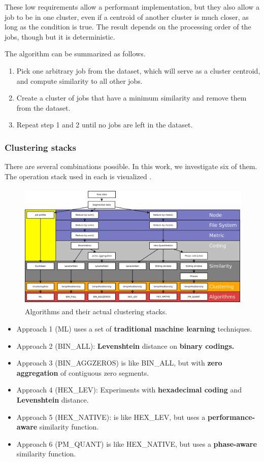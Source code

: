 \documentclass[]{llncs}
\begin{document}
These low requirements allow a performant implementation, but they also allow a job to be in one cluster, even if a centroid of another cluster is much closer, as long as the condition is true.
The result depends on the processing order of the jobs, though but it is deterministic.

The algorithm can be summarized as follows.

\begin{enumerate}
 \item Pick one arbitrary job from the dataset, which will serve as a cluster centroid, and compute similarity to all other jobs.
 \item Create a cluster of jobs that have a minimum similarity and remove them from the dataset.
 \item Repeat step 1 and 2 until no jobs are left in the dataset.
\end{enumerate}

\subsubsection{Clustering stacks}
There are several combinations possible.
In this work, we investigate six of them.
The operation stack used in each is visualized .

\begin{figure}
  \centering
  \includegraphics[width=4.61in,height=2.38in]{./media/image3.png}
  \caption{Algorithms and their actual clustering stacks.}
  \label{fig:clustering_stacks}
\end{figure}

\begin{itemize}
 \item Approach 1 (ML) uses a set of\textbf{ traditional machine learning} techniques. 
 \item Approach 2 (BIN\_ALL): \textbf{Levenshtein} distance on \textbf{binary codings.}
 \item Approach 3 (BIN\_AGGZEROS) is like BIN\_ALL, but with \textbf{zero aggregation }of contiguous zero segments.
 \item Approach 4 (HEX\_LEV): Experiments with \textbf{hexadecimal coding }and \textbf{Levenshtein }distance.
 \item Approach 5 (HEX\_NATIVE): is like HEX\_LEV, but uses a \textbf{performance-aware }similarity function.
 \item Approach 6 (PM\_QUANT) is like HEX\_NATIVE, but uses a \textbf{phase-aware }similarity function.
\end{itemize}
\end{document}
